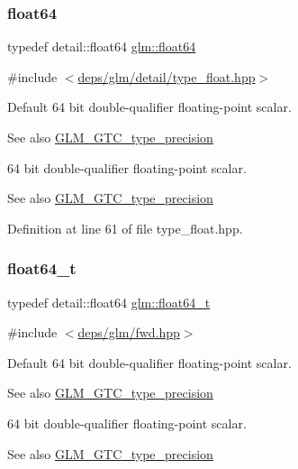 \subsubsection{\texorpdfstring{float64}{float64}}
{\footnotesize\ttfamily typedef detail\+::float64 \hyperlink{group__gtc__type__precision_gab721f828b41f46b20cf4883b50733d3b}{glm\+::float64}}



{\ttfamily \#include $<$\hyperlink{type__float_8hpp}{deps/glm/detail/type\+\_\+float.\+hpp}$>$}

Default 64 bit double-\/qualifier floating-\/point scalar. \begin{DoxySeeAlso}{See also}
\hyperlink{group__gtc__type__precision}{G\+L\+M\+\_\+\+G\+T\+C\+\_\+type\+\_\+precision}
\end{DoxySeeAlso}
64 bit double-\/qualifier floating-\/point scalar. \begin{DoxySeeAlso}{See also}
\hyperlink{group__gtc__type__precision}{G\+L\+M\+\_\+\+G\+T\+C\+\_\+type\+\_\+precision} 
\end{DoxySeeAlso}


Definition at line 61 of file type\+\_\+float.\+hpp.

\mbox{\label{group__gtc__type__precision_gade966a3eb25ebeb16dd53c40d3fdeb46}} 
\subsubsection{\texorpdfstring{float64\+\_\+t}{float64\_t}}
{\footnotesize\ttfamily typedef detail\+::float64 \hyperlink{group__gtc__type__precision_gade966a3eb25ebeb16dd53c40d3fdeb46}{glm\+::float64\+\_\+t}}



{\ttfamily \#include $<$\hyperlink{fwd_8hpp}{deps/glm/fwd.\+hpp}$>$}

Default 64 bit double-\/qualifier floating-\/point scalar. \begin{DoxySeeAlso}{See also}
\hyperlink{group__gtc__type__precision}{G\+L\+M\+\_\+\+G\+T\+C\+\_\+type\+\_\+precision}
\end{DoxySeeAlso}
64 bit double-\/qualifier floating-\/point scalar. \begin{DoxySeeAlso}{See also}
\hyperlink{group__gtc__type__precision}{G\+L\+M\+\_\+\+G\+T\+C\+\_\+type\+\_\+precision} 
\end{DoxySeeAlso}


